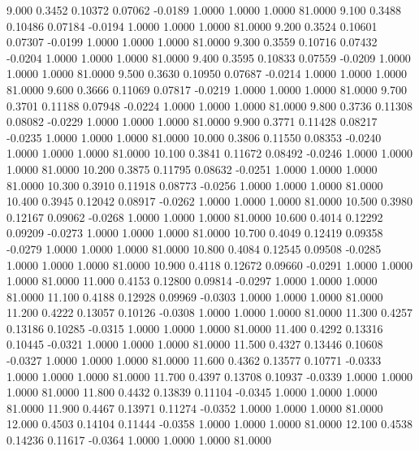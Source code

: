    9.000   0.3452   0.10372   0.07062  -0.0189   1.0000   1.0000   1.0000  81.0000
   9.100   0.3488   0.10486   0.07184  -0.0194   1.0000   1.0000   1.0000  81.0000
   9.200   0.3524   0.10601   0.07307  -0.0199   1.0000   1.0000   1.0000  81.0000
   9.300   0.3559   0.10716   0.07432  -0.0204   1.0000   1.0000   1.0000  81.0000
   9.400   0.3595   0.10833   0.07559  -0.0209   1.0000   1.0000   1.0000  81.0000
   9.500   0.3630   0.10950   0.07687  -0.0214   1.0000   1.0000   1.0000  81.0000
   9.600   0.3666   0.11069   0.07817  -0.0219   1.0000   1.0000   1.0000  81.0000
   9.700   0.3701   0.11188   0.07948  -0.0224   1.0000   1.0000   1.0000  81.0000
   9.800   0.3736   0.11308   0.08082  -0.0229   1.0000   1.0000   1.0000  81.0000
   9.900   0.3771   0.11428   0.08217  -0.0235   1.0000   1.0000   1.0000  81.0000
  10.000   0.3806   0.11550   0.08353  -0.0240   1.0000   1.0000   1.0000  81.0000
  10.100   0.3841   0.11672   0.08492  -0.0246   1.0000   1.0000   1.0000  81.0000
  10.200   0.3875   0.11795   0.08632  -0.0251   1.0000   1.0000   1.0000  81.0000
  10.300   0.3910   0.11918   0.08773  -0.0256   1.0000   1.0000   1.0000  81.0000
  10.400   0.3945   0.12042   0.08917  -0.0262   1.0000   1.0000   1.0000  81.0000
  10.500   0.3980   0.12167   0.09062  -0.0268   1.0000   1.0000   1.0000  81.0000
  10.600   0.4014   0.12292   0.09209  -0.0273   1.0000   1.0000   1.0000  81.0000
  10.700   0.4049   0.12419   0.09358  -0.0279   1.0000   1.0000   1.0000  81.0000
  10.800   0.4084   0.12545   0.09508  -0.0285   1.0000   1.0000   1.0000  81.0000
  10.900   0.4118   0.12672   0.09660  -0.0291   1.0000   1.0000   1.0000  81.0000
  11.000   0.4153   0.12800   0.09814  -0.0297   1.0000   1.0000   1.0000  81.0000
  11.100   0.4188   0.12928   0.09969  -0.0303   1.0000   1.0000   1.0000  81.0000
  11.200   0.4222   0.13057   0.10126  -0.0308   1.0000   1.0000   1.0000  81.0000
  11.300   0.4257   0.13186   0.10285  -0.0315   1.0000   1.0000   1.0000  81.0000
  11.400   0.4292   0.13316   0.10445  -0.0321   1.0000   1.0000   1.0000  81.0000
  11.500   0.4327   0.13446   0.10608  -0.0327   1.0000   1.0000   1.0000  81.0000
  11.600   0.4362   0.13577   0.10771  -0.0333   1.0000   1.0000   1.0000  81.0000
  11.700   0.4397   0.13708   0.10937  -0.0339   1.0000   1.0000   1.0000  81.0000
  11.800   0.4432   0.13839   0.11104  -0.0345   1.0000   1.0000   1.0000  81.0000
  11.900   0.4467   0.13971   0.11274  -0.0352   1.0000   1.0000   1.0000  81.0000
  12.000   0.4503   0.14104   0.11444  -0.0358   1.0000   1.0000   1.0000  81.0000
  12.100   0.4538   0.14236   0.11617  -0.0364   1.0000   1.0000   1.0000  81.0000
